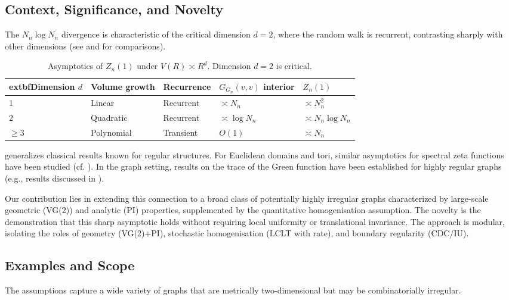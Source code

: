 \documentclass{article}
\numberwithin{equation}{section}
\theoremstyle{definition}
\theoremstyle{remark}
\begin{document}
\subsection{Context, Significance, and Novelty}
The $N_n \log N_n$ divergence is characteristic of the critical dimension $d=2$, where the random walk is recurrent, contrasting sharply with other dimensions (see  and  for comparisons).

\begin{table}[h!]
\centering
\small
\caption{Asymptotics of $Z_n(1)$ under $V(R) \asymp R^d$. Dimension $d=2$ is critical.}
\label{tab:growth}
\begin{tabular}{@{}lllll@{}}\toprule
	extbf{Dimension $d$} & \textbf{Volume growth} & \textbf{Recurrence} & \textbf{$G_{G_n}(v,v)$ interior} & \textbf{$Z_n(1)$} \\
\midrule
1 & Linear & Recurrent & $\asymp N_n$ & $\asymp N_n^{2}$ \\
2 & Quadratic & Recurrent & $\asymp \log N_n$ & $\asymp N_n \log N_n$ \\
$\ge 3$ & Polynomial & Transient & $O(1)$ & $\asymp N_n$ \\
\bottomrule
\end{tabular}
\end{table}

 generalizes classical results known for regular structures. For Euclidean domains and tori, similar asymptotics for spectral zeta functions have been studied (cf. \cite{Colin85, Frank10}). In the graph setting, results on the trace of the Green function have been established for highly regular graphs (e.g., results discussed in \cite{MizunoTachikawa03, Kaimanovich00}).

Our contribution lies in extending this connection to a broad class of potentially highly irregular graphs characterized by large-scale geometric (VG(2)) and analytic (PI) properties, supplemented by the quantitative homogenisation assumption. The novelty is the demonstration that this sharp asymptotic holds without requiring local uniformity or translational invariance. The approach is modular, isolating the roles of geometry (VG(2)+PI), stochastic homogenisation (LCLT with rate), and boundary regularity (CDC/IU).

\subsection{Examples and Scope}
The assumptions capture a wide variety of graphs that are metrically two-dimensional but may be combinatorially irregular.
\end{document}
